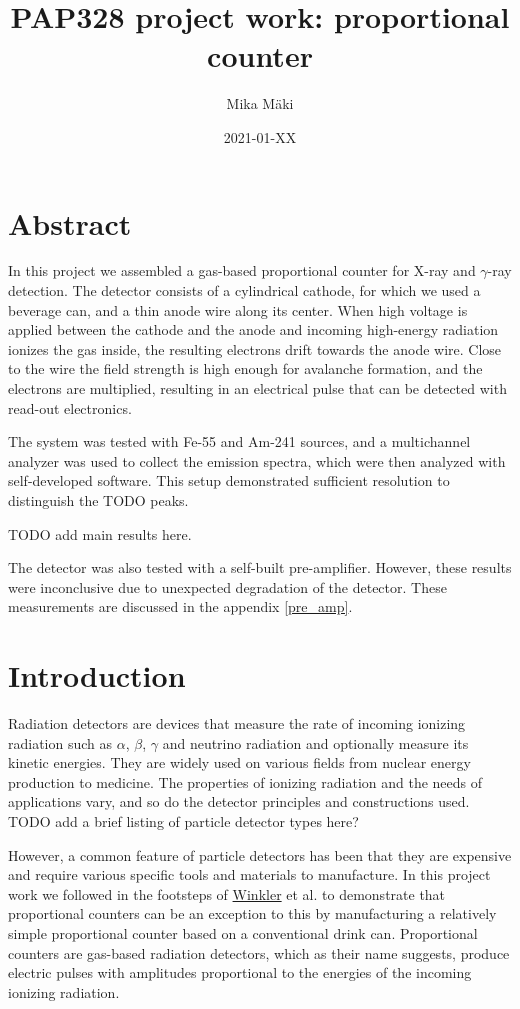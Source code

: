 \documentclass[a4paper]{article}
\title{PAP328 project work: proportional counter}
\author{Mika Mäki}
\date{2021-01-XX}
\begin{document}
\maketitle

\section*{Abstract}
In this project we assembled a gas-based proportional counter for X-ray and $\gamma$-ray detection.
The detector consists of a cylindrical cathode, for which we used a beverage can, and a thin anode wire along its center.
When high voltage is applied between the cathode and the anode and incoming high-energy radiation ionizes the gas inside, the resulting electrons drift towards the anode wire.
Close to the wire the field strength is high enough for avalanche formation, and the electrons are multiplied, resulting in an electrical pulse that can be detected with read-out electronics.

The system was tested with Fe-55 and Am-241 sources, and a multichannel analyzer was used to collect the emission spectra, which were then analyzed with self-developed software.
This setup demonstrated sufficient resolution to distinguish the TODO peaks.

TODO add main results here.

The detector was also tested with a self-built pre-amplifier.
However, these results were inconclusive due to unexpected degradation of the detector.
These measurements are discussed in the appendix \ref{pre_amp}.

\tableofcontents


\section{Introduction}
\label{introduction}
Radiation detectors are devices that measure the rate of incoming ionizing radiation such as $\alpha$, $\beta$, $\gamma$ and neutrino radiation and optionally measure its kinetic energies.
They are widely used on various fields from nuclear energy production to medicine.
The properties of ionizing radiation and the needs of applications vary, and so do the detector principles and constructions used.
TODO add a brief listing of particle detector types here?

However, a common feature of particle detectors has been that they are expensive and require various specific tools and materials to manufacture.
In this project work we followed in the footsteps of
\href{https://www.helsinki.fi/en/people/people-finder/alexander-winkler-9110087}{Winkler}
et al. \cite{winkler_gaseous_2015} to demonstrate that proportional counters can be an exception to this by manufacturing a relatively simple proportional counter based on a conventional drink can.
Proportional counters are gas-based radiation detectors, which as their name suggests, produce electric pulses with amplitudes proportional to the energies of the incoming ionizing radiation.
\end{document}

